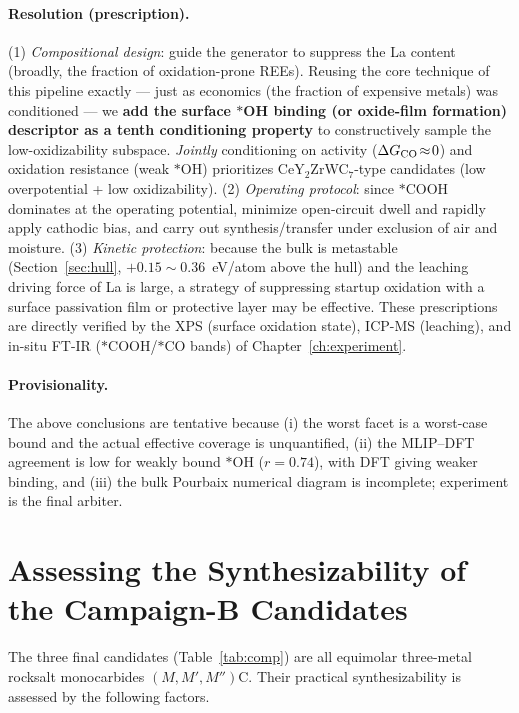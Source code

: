 \documentclass[11pt,a4paper]{report}
\begin{document}
\paragraph{Resolution (prescription).} (1) \emph{Compositional design}: guide the generator to suppress the La
content (broadly, the fraction of oxidation-prone REEs). Reusing the core technique of this pipeline exactly ---
just as economics (the fraction of expensive metals) was conditioned --- we \textbf{add the surface $*$OH binding
(or oxide-film formation) descriptor as a tenth conditioning property} to constructively sample the
low-oxidizability subspace. \emph{Jointly} conditioning on activity ($\Delta G_{\rm CO}\!\approx\!0$) and
oxidation resistance (weak $*$OH) prioritizes CeY$_2$ZrWC$_7$-type candidates (low overpotential + low
oxidizability). (2) \emph{Operating protocol}: since $*$COOH dominates at the operating potential, minimize
open-circuit dwell and rapidly apply cathodic bias, and carry out synthesis/transfer under exclusion of air and
moisture. (3) \emph{Kinetic protection}: because the bulk is metastable (Section~\ref{sec:hull}, $+0.15\!\sim\!0.36$~eV/atom
above the hull) and the leaching driving force of La is large, a strategy of suppressing startup oxidation with a
surface passivation film or protective layer may be effective. These prescriptions are directly verified by the
XPS (surface oxidation state), ICP-MS (leaching), and in-situ FT-IR ($*$COOH/$*$CO bands) of
Chapter~\ref{ch:experiment}.

\paragraph{Provisionality.} The above conclusions are tentative because (i) the worst facet is a worst-case
bound and the actual effective coverage is unquantified, (ii) the MLIP--DFT agreement is low for weakly bound
$*$OH ($r{=}0.74$), with DFT giving weaker binding, and (iii) the bulk Pourbaix numerical diagram is incomplete;
experiment is the final arbiter.

\section{Assessing the Synthesizability of the Campaign-B Candidates}
\label{sec:synth-feasibility}
The three final candidates (Table~\ref{tab:comp}) are all equimolar three-metal rocksalt monocarbides
$(M,M',M'')$C. Their practical synthesizability is assessed by the following factors.
\end{document}

